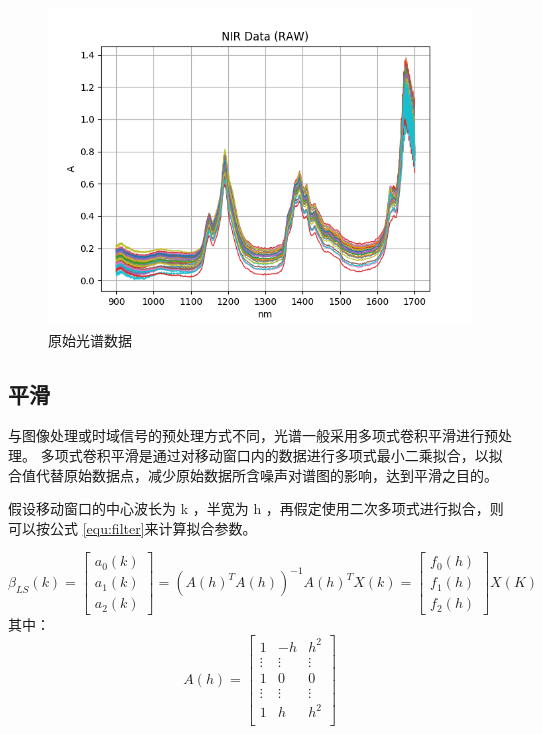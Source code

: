 \documentclass[a4paper]{article}
\begin{document}
		\begin{figure}[h]
			\centering
			\includegraphics[width=\linewidth]{../img/raw}
			\caption{原始光谱数据}
			\label{fig:nir-data-raw}
		\end{figure}
	
		\subsection{平滑}\label{section:filter}
			与图像处理或时域信号的预处理方式不同，光谱一般采用多项式卷积平滑进行预处理。
			多项式卷积平滑是通过对移动窗口内的数据进行多项式最小二乘拟合，以拟合值代替原始数据点，减少原始数据所含噪声对谱图的影响，达到平滑之目的。
			
			假设移动窗口的中心波长为 k ，半宽为 h ，再假定使用二次多项式进行拟合，则可以按公式 \eqref{equ:filter}来计算拟合参数。
			
			\begin{equation}\label{equ:filter}
				\beta_{LS}(k) = 
				\begin{bmatrix}
					a_0(k) \\ a_1(k) \\ a_2(k)
				\end{bmatrix}
				= \left( A(h)^TA(h) \right)^{-1}A(h)^TX(k) = 
				\begin{bmatrix}
					f_0(h) \\ f_1(h) \\ f_2(h)
				\end{bmatrix} 
				X(K)
			\end{equation}
			其中：
			\[
				A(h) =
				\begin{bmatrix}
					1 & -h & h^2 \\
					\vdots & \vdots & \vdots \\
					1 & 0 & 0 \\
					\vdots & \vdots & \vdots \\
					1 & h & h^2 \\
				\end{bmatrix} 
			\]
			
\end{document}
